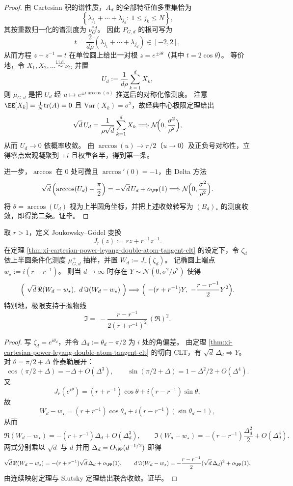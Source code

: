 \begin{proof}
由 Cartesian 积的谱性质，\(A_d\) 的全部特征值多重集恰为
\[
\left\{\lambda_{j_1}+\cdots+\lambda_{j_d}:\ 1\le j_k\le N\right\},
\]
其按重数归一化的谱测度为 \(\nu_G^{*d}\)。
因此 \(P_{G,d}\) 的根可写为
\[
t=\frac{2}{d\rho}(\lambda_{j_1}+\cdots+\lambda_{j_d})\in[-2,2],
\]
从而方程 \(z+z^{-1}=t\) 在单位圆上给出一对根 \(z=e^{\pm i\theta}\)（其中 \(t=2\cos\theta\)）。
等价地，令 \(X_1,X_2,\dots\overset{\mathrm{i.i.d.}}{\sim}\nu_G\) 并置
\[
U_d:=\frac{1}{d\rho}\sum_{k=1}^{d}X_k,
\]
则 \(\mu_{G,d}\) 是把 \(U_d\) 经 \(u\mapsto e^{\pm i\arccos(u)}\) 推送后的对称化像测度。
注意 \(\EE[X_k]=\tfrac1N\mathrm{tr}(A)=0\) 且 \(\mathrm{Var}(X_k)=\sigma^2\)，故经典中心极限定理给出
\[
\sqrt d\,U_d=\frac{1}{\rho\sqrt d}\sum_{k=1}^{d}X_k
\Longrightarrow
\mathcal N\!\Bigl(0,\frac{\sigma^2}{\rho^2}\Bigr),
\]
从而 \(U_d\to 0\) 依概率收敛。
由 \(\arccos(u)\to \pi/2\)（\(u\to 0\)）及正负号对称性，立得零点宏观凝聚到 \(\pm i\) 且权重各半，得到第一条。
\par
进一步，\(\arccos\) 在 \(0\) 处可微且 \(\arccos'(0)=-1\)，由 Delta 方法
\[
\sqrt d\left(\arccos(U_d)-\frac{\pi}{2}\right)

=-\sqrt d\,U_d+o_{\PP}(1)
\Longrightarrow
\mathcal N\!\Bigl(0,\frac{\sigma^2}{\rho^2}\Bigr).
\]
将 \(\theta=\arccos(U_d)\) 视为上半圆角坐标，并把上述收敛转写为 \((B_d)_*\) 的测度收敛，即得第二条。证毕。
\end{proof}

\begin{theorem}\label{thm:xi-cartesian-power-joukowsky-godel-anisotropic-parabola}
取 \(r>1\)，定义 Joukowsky--Gödel 变换
\[
J_r(z):=rz+r^{-1}z^{-1}.
\]
在定理 \ref{thm:xi-cartesian-power-leyang-double-atom-tangent-clt} 的设定下，令 \(\zeta_d\) 依上半圆条件化测度 \(\mu_{G,d}^{+}\) 抽样，并置 \(W_d:=J_r(\zeta_d)\)。
记椭圆上端点 \(w_\star:=i(r-r^{-1})\)。
则当 \(d\to\infty\) 时存在 \(Y\sim\mathcal N(0,\sigma^2/\rho^2)\) 使得
\[
\Bigl(\ \sqrt d\,\Re(W_d-w_\star),\ d\,\Im(W_d-w_\star)\ \Bigr)
\Longrightarrow
\Bigl(\ -(r+r^{-1})Y,\ -\frac{r-r^{-1}}{2}Y^2\Bigr).
\]
特别地，极限支持于抛物线
\[
\Im=\ -\frac{r-r^{-1}}{2(r+r^{-1})^2}\,(\Re)^2.
\]
\end{theorem}

\begin{proof}
写 \(\zeta_d=e^{i\theta_d}\)，并令 \(\Delta_d:=\theta_d-\pi/2\) 为 \(i\) 处的角偏差。
由定理 \ref{thm:xi-cartesian-power-leyang-double-atom-tangent-clt} 的切向 CLT，有 \(\sqrt d\,\Delta_d\Rightarrow Y\)。
对 \(\theta=\pi/2+\Delta\) 作泰勒展开：
\[
\cos(\pi/2+\Delta)=-\Delta+O(\Delta^3),
\qquad
\sin(\pi/2+\Delta)=1-\Delta^2/2+O(\Delta^4).
\]
又
\[
J_r(e^{i\theta})=(r+r^{-1})\cos\theta+i(r-r^{-1})\sin\theta,
\]
故
\[
W_d-w_\star
=(r+r^{-1})\cos\theta_d+i(r-r^{-1})(\sin\theta_d-1),
\]
从而
\[
\Re(W_d-w_\star)=-(r+r^{-1})\Delta_d+O(\Delta_d^3),
\qquad
\Im(W_d-w_\star)=-(r-r^{-1})\frac{\Delta_d^2}{2}+O(\Delta_d^4).
\]
两式分别乘以 \(\sqrt d\) 与 \(d\) 并用 \(\Delta_d=O_{\PP}(d^{-1/2})\) 即得
\[
\sqrt d\,\Re(W_d-w_\star)=-(r+r^{-1})\sqrt d\,\Delta_d+o_{\PP}(1),
\qquad
d\,\Im(W_d-w_\star)=-\frac{r-r^{-1}}{2}(\sqrt d\,\Delta_d)^2+o_{\PP}(1).
\]
由连续映射定理与 Slutsky 定理给出联合收敛。证毕。
\end{proof}

